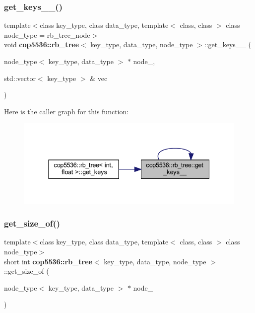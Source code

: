 \subsubsection{get\_keys\_\_()}
{\footnotesize\ttfamily template$<$class key\+\_\+type, class data\+\_\+type, template$<$ class, class $>$ class node\+\_\+type = rb\+\_\+tree\+\_\+node$>$ \\
void \textbf{ cop5536\+::rb\+\_\+tree}$<$ key\+\_\+type, data\+\_\+type, node\+\_\+type $>$\+::get\+\_\+keys\+\_\+\+\_\+ (\begin{DoxyParamCaption}\item[{node\+\_\+type$<$ key\+\_\+type, data\+\_\+type $>$ $\ast$}]{node\+\_\+,  }\item[{std\+::vector$<$ key\+\_\+type $>$ \&}]{vec }\end{DoxyParamCaption})\hspace{0.3cm}{\ttfamily [inline]}}

Here is the caller graph for this function\+:
\nopagebreak
\begin{figure}[H]
\begin{center}
\leavevmode
\includegraphics[width=337pt]{classcop5536_1_1rb__tree_aefd87c14dbf669cbd964b69112d1b553_icgraph}
\end{center}
\end{figure}
\mbox{\label{classcop5536_1_1rb__tree_a675b0beb2560be3caef4001ac079d605}} 
\subsubsection{get\_size\_of()}
{\footnotesize\ttfamily template$<$class key\+\_\+type, class data\+\_\+type, template$<$ class, class $>$ class node\+\_\+type$>$ \\
short int \textbf{ cop5536\+::rb\+\_\+tree}$<$ key\+\_\+type, data\+\_\+type, node\+\_\+type $>$\+::get\+\_\+size\+\_\+of (\begin{DoxyParamCaption}\item[{node\+\_\+type$<$ key\+\_\+type, data\+\_\+type $>$ $\ast$}]{node\+\_\+ }\end{DoxyParamCaption})\hspace{0.3cm}{\ttfamily [inline]}}

